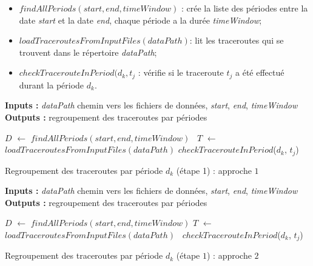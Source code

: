 \begin{itemize}
	\item $ findAllPeriods(start, end, timeWindow)  $ : crée la liste des périodes entre la date  \textit{start} et la date \textit{end}, chaque période a la durée \textit{timeWindow};
	
	\item  $ loadTraceroutesFromInputFiles(dataPath)  $: lit les traceroutes qui se trouvent dans le répertoire  \textit{dataPath};
	
	\item   $ checkTracerouteInPeriod (d_k, t_{j}$ : vérifie si le traceroute $ t_{j}  $ a été effectué durant la période $d_k$.
\end{itemize}


\begin{algorithm}[H]
	\hspace*{\algorithmicindent} \textbf{Inputs :} \textit{dataPath} chemin vers les fichiers de données, \textit{start}, \textit{end}, \textit{timeWindow}\\
	\hspace*{\algorithmicindent} \textbf{Outputs :} regroupement des traceroutes par périodes
	\begin{algorithmic}[1]
	\State $D$ $\leftarrow$ $ findAllPeriods(start, end, timeWindow) $
	 \
	\State $T$ $\leftarrow$ \textit{$ loadTraceroutesFromInputFiles(dataPath) $}
	\ForAll{$t_{j}$ $\in$ $T$}
	\State $ checkTracerouteInPeriod $($d_k$, $t_{j}$) 
	\EndFor
	\EndFor
\end{algorithmic}
	\caption{Regroupement des traceroutes par période $d_k$ (étape 1) : approche $ 1 $}
	\label{algo:grouper-traceroutes_1}
\end{algorithm}

\begin{algorithm}[H]
	\hspace*{\algorithmicindent} \textbf{Inputs :} \textit{dataPath} chemin vers les fichiers de données, \textit{start}, \textit{end}, \textit{timeWindow}\\
	\hspace*{\algorithmicindent} \textbf{Outputs :} regroupement des traceroutes par périodes
	\begin{algorithmic}[1]
		\State $D$ $\leftarrow$ $ findAllPeriods(start, end, timeWindow) $
		\State $T$ $\leftarrow$ $ loadTraceroutesFromInputFiles( dataPath) $
		\ForAll{$t_{j}$ $\in$ $T$}
		 \
		\State $ checkTracerouteInPeriod $($d_k$, $t_{j}$) 
		\EndFor
		\EndFor
	\end{algorithmic}
	\caption{  Regroupement des traceroutes par période $d_k$ (étape $ 1 $) : approche $ 2 $}
	\label{algo:grouper-traceroutes_2}
\end{algorithm}

